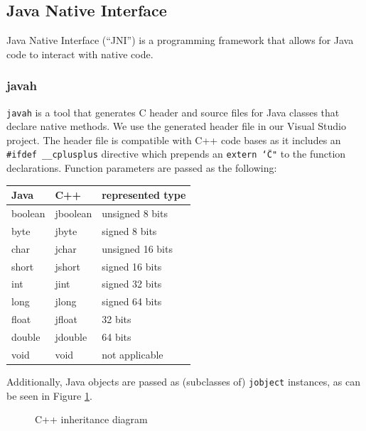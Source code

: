 \documentclass[]{article}
\begin{document}
\subsection{Java Native Interface}
Java Native Interface (\enquote{JNI}) is a programming framework that allows for Java code to interact with native code.
\subsubsection{javah}
\texttt{javah} is a tool that generates C header and source files for Java classes that declare native methods.
We use the generated header file in our Visual Studio project.
The header file is compatible with C++ code bases as it includes an \texttt{\#ifdef \_\_cplusplus} directive which prepends an \texttt{extern \char`\"C"} to the function declarations.
\cite{noauthor_jni_nodate} Function parameters are passed as the following:

\begin{center}
\begin{tabular}{|l|l|l|} \hline
  Java & C++ & represented type \\ \hline
  boolean & jboolean & unsigned 8 bits \\ 
  byte & jbyte & signed 8 bits \\ 
  char & jchar & unsigned 16 bits \\ 
  short & jshort & signed 16 bits \\ 
  int & jint & signed 32 bits \\ 
  long & jlong & signed 64 bits \\ 
  float & jfloat & 32 bits \\ 
  double & jdouble & 64 bits \\ 
  void & void & not applicable \\ \hline
\end{tabular}
\end{center}

Additionally, Java objects are passed as (subclasses of) \texttt{jobject} instances, as can be seen in Figure \ref{fig:jobject}.

\begin{figure}
  \begin{center}
  \end{center}
\caption{C++ inheritance diagram}
\label{fig:jobject}
\end{figure}
\end{document}
